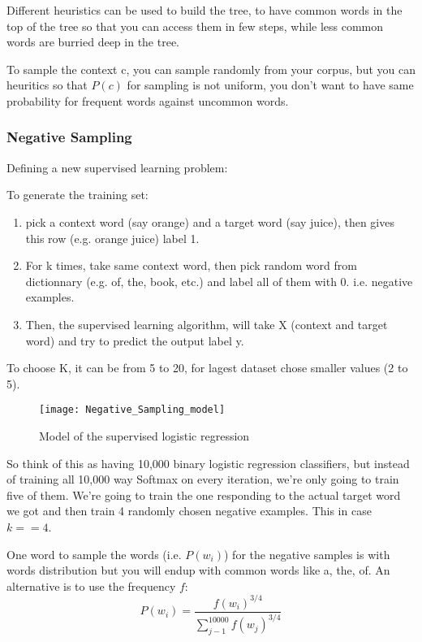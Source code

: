 Different heuristics can be used to build the tree, to have common words in the top of the tree so that you can access them in few steps, while less common words are burried deep in the tree.

To sample the context c, you can sample randomly from your corpus, but you can heuritics so that $P(c)$ for sampling is not uniform, you don't want to have same probability for frequent words against uncommon words.

\subsubsection{Negative Sampling}
Defining a new supervised learning problem:

To generate the training set: 
\begin{enumerate}
    \item pick a context word (say orange) and a target word (say juice), then gives this row (e.g. orange juice) label 1.
    \item For k times, take same context word, then pick random word from dictionnary (e.g. of, the, book, etc.) and label all of them with 0. i.e. negative examples.
    \item Then, the supervised learning algorithm, will take X (context and target word) and try to predict the output label y.
\end{enumerate}
To choose K, it can be from 5 to 20, for lagest dataset chose smaller values (2 to 5).

\begin{figure}[H]
\centering
\texttt{[image: Negative\_Sampling\_model]}
\caption{Model of the supervised logistic regression}
\end{figure}

So think of this as having 10,000 binary logistic regression classifiers, but instead of training all 10,000 way Softmax on every iteration, we're only going to train five of them. We're going to train the one responding to the actual target word we got and then train 4 randomly chosen negative examples. This in case $k == 4$.


One word to sample the words (i.e. $P(w_i)$) for the negative samples is with words distribution but you will endup with common words like a, the, of. An alternative is to use the frequency $f$:
\begin{equation*}
    P(w_i) = \frac{f(w_i)^{3/4}}{\sum^{10000}_{j-1} f(w_j)^{3/4}}
\end{equation*}


